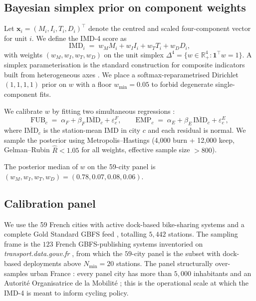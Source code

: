 \documentclass[11pt,a4paper]{article}
\newcommand{\IMD}{\mathrm{IMD}}
\begin{document}
\subsection{Bayesian simplex prior on component weights}
\label{sec:bayes}

Let $\mathbf{x}_i = (M_i, I_i, T_i, D_i)^{\top}$ denote the centred
and scaled four-component vector for unit $i$.  We define the IMD-4
score as
\[
    \IMD_i \;=\; w_M M_i + w_I I_i + w_T T_i + w_D D_i,
\]
with weights $(w_M, w_I, w_T, w_D)$ on the unit simplex
$\Delta^{4} = \{ w \in \mathbb{R}_{+}^{4} : \mathbf{1}^{\top} w = 1 \}$.
A simplex parameterisation is the standard construction for composite
indicators built from heterogeneous axes
\citep{OECD2008,Saisana2005}.  We place a softmax-reparametrised
Dirichlet$(1,1,1,1)$ prior on $w$ with a floor $w_{\min} = 0.05$
to forbid degenerate single-component fits.

We calibrate $w$ by fitting two simultaneous regressions :
\[
    \mathrm{FUB}_c \;=\; \alpha_F + \beta_F\, \overline{\IMD}_c + \varepsilon^{F}_{c}, \qquad
    \mathrm{EMP}_c \;=\; \alpha_E + \beta_E\, \overline{\IMD}_c + \varepsilon^{E}_{c},
\]
where $\overline{\IMD}_c$ is the station-mean IMD in city $c$ and
each residual is normal.  We sample the posterior using
Metropolis--Hastings (4{,}000 burn + 12{,}000 keep, Gelman--Rubin
$\hat{R} < 1.05$ for all weights, effective sample size $> 800$).

The posterior median of $w$ on the 59-city panel is
$(w_M, w_I, w_T, w_D) = (0.78, 0.07, 0.08, 0.06)$.

\subsection{Calibration panel}
\label{sec:calibration}

We use the 59 French cities with active dock-based bike-sharing
systems and a complete Gold Standard GBFS feed \citep{Fosse2026gold},
totalling $5{,}442$ stations.  The sampling frame is the $123$
French GBFS-publishing systems inventoried on
\emph{transport.data.gouv.fr} \citep{Fosse2026gold}, from which
the $59$-city panel is the subset with dock-based deployments
above $N_{\min} = 20$ stations.  The panel structurally over-
samples urban France : every panel city has more than $5{,}000$
inhabitants and an Autorit\'e Organisatrice de la Mobilit\'e ;
this is the operational scale at which the IMD-4 is meant to
inform cycling policy.

\end{document}
